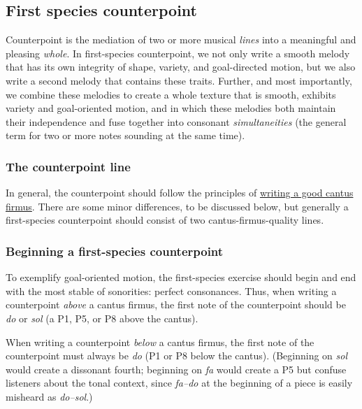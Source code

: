\documentclass{book}
\begin{document}
\hypertarget{first-species-counterpoint}{%
\subsection{First species counterpoint}\label{first-species-counterpoint}}

Counterpoint is the mediation of two or more musical \emph{lines} into a
meaningful and pleasing \emph{whole}. In first-species counterpoint, we not
only write a smooth melody that has its own integrity of shape, variety, and
goal-directed motion, but we also write a second melody that contains these
traits. Further, and most importantly, we combine these melodies to create a
whole texture that is smooth, exhibits variety and goal-oriented motion, and
in which these melodies both maintain their independence and fuse together
into consonant \emph{simultaneities} (the general term for two or more notes
sounding at the same time).

\hypertarget{the-counterpoint-line}{%
\subsubsection{The counterpoint line}\label{the-counterpoint-line}}

In general, the counterpoint should follow the principles of
\href{cantusFirmus.html}{writing a good cantus firmus}. There are some minor
differences, to be discussed below, but generally a first-species counterpoint
should consist of two cantus-firmus-quality lines.

\hypertarget{beginning-a-first-species-counterpoint}{%
\subsubsection{Beginning a first-species
counterpoint}\label{beginning-a-first-species-counterpoint}}

To exemplify goal-oriented motion, the first-species exercise should begin and
end with the most stable of sonorities: perfect consonances. Thus, when
writing a counterpoint \emph{above} a cantus firmus, the first note of the
counterpoint should be \emph{do} or \emph{sol} (a P1, P5, or P8 above the
cantus).

When writing a counterpoint \emph{below} a cantus firmus, the first note of
the counterpoint must always be \emph{do} (P1 or P8 below the cantus).
(Beginning on \emph{sol} would create a dissonant fourth; beginning on
\emph{fa} would create a P5 but confuse listeners about the tonal context,
since \emph{fa--do} at the beginning of a piece is easily misheard as
\emph{do--sol}.)
\end{document}

